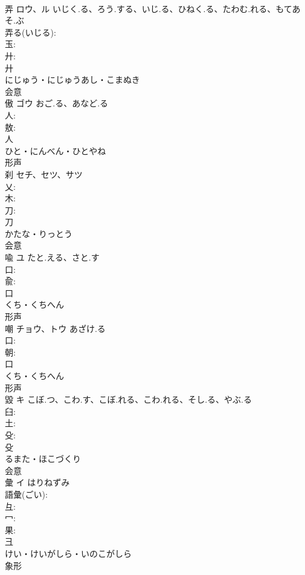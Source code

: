 \documentclass[8pt]{extreport}
\begin{document}
\begin{CJK}{UTF8}{min}
\\	弄	ロウ、ル	いじく.る、ろう.する、いじ.る、ひねく.る、たわむ.れる、もてあそ.ぶ		
\\	弄る(いじる): 
\\	玉: 
\\	廾: 
\\	廾	
\\	にじゅう・にじゅうあし・こまぬき	
\\	会意 
\\	傲	ゴウ	おご.る、あなど.る		
\\	人: 
\\	敖: 
\\	人	
\\	ひと・にんべん・ひとやね	
\\	形声 
\\	刹	セチ、セツ、サツ			
\\	乂: 
\\	木: 
\\	刀: 
\\	刀	
\\	かたな・りっとう	
\\	会意 
\\	喩	ユ	たと.える、さと.す		
\\	口: 
\\	兪: 
\\	口	
\\	くち・くちへん	
\\	形声 
\\	嘲	チョウ、トウ	あざけ.る		
\\	口: 
\\	朝: 
\\	口	
\\	くち・くちへん	
\\	形声 
\\	毀	キ	こぼ.つ、こわ.す、こぼ.れる、こわ.れる、そし.る、やぶ.る		
\\	臼: 
\\	土: 
\\	殳: 
\\	殳	
\\	るまた・ほこづくり	
\\	会意 
\\	彙	イ	はりねずみ		
\\	語彙(ごい): 
\\	彑: 
\\	冖: 
\\	果: 
\\	彐	
\\	けい・けいがしら・いのこがしら	
\\	象形 

\end{CJK}
\end{document}
